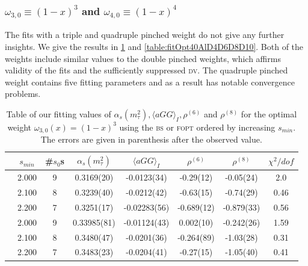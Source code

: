 \documentclass[../../index.tex]{subfiles}
\begin{document}
\subsubsection{\( \omega_{3,0} \equiv (1-x)^3\) and \(\omega_{4,0} \equiv
  (1-x)^4\)}
The fits with a triple and quadruple pinched weight do not give any further
insights. We give the results in \cref{table:fitOpt30AlD4D6D8} and
\cref{table:fitOpt40AlD4D6D8D10}. Both of the weights include similar values to
the double pinched weights, which affirms validity of the fits and the
sufficiently suppressed \textsc{dv}. The quadruple pinched weight contains five
fitting parameters and as a result has notable convergence problems.
\begin{table}
  \centering
  \begin{tabular}{cccccccc}
    \toprule
    & \(s_{min}\) & \#\(s_0\)s & \(\alpha_s(m_\tau^2)\) & \(\langle aGG \rangle_I\) & \(\rho^{(6)}\) & \(\rho^{(8)}\) & \(\chi^2/dof\)  \\
    \midrule
    \parbox[t]{2mm}{}
    & 2.000 & 9 & 0.3169(20) & -0.0123(34) & -0.29(12) & -0.05(24) & 2.0 \\
    & 2.100 & 8 & 0.3239(40) & -0.0212(42) & -0.63(15) & -0.74(29) & 0.46 \\
    & 2.200 & 7 & 0.3251(17) & -0.02283(56) & -0.689(12) & -0.879(33) & 0.56 \\
    \midrule
    \parbox[t]{2mm}{}
    & 2.000 & 9  & 0.33985(81) & -0.01124(43) & 0.002(10) & -0.242(26) & 1.59 \\
    & 2.100 & 8  & 0.3480(47) & -0.0201(36) & -0.264(89) & -1.03(28) & 0.31 \\
    & 2.200 & 7  & 0.3483(23) & -0.0204(41) & -0.27(15) & -1.05(40) & 0.41 \\
    \bottomrule
  \end{tabular}
  \caption{Table of our fitting values of \(\alpha_s(m_\tau^2), \langle aGG
    \rangle_I, \rho^{(6)}\) and \(\rho^{(8)}\) for the optimal weight
    \(\omega_{3,0}(x)=(1-x)^3\) using the \textsc{bs} or \textsc{fopt} ordered
    by increasing \(s_{min}\). The errors are given in parenthesis after the
    observed value.}
  \label{table:fitOpt30AlD4D6D8}
\end{table}
\end{document}
